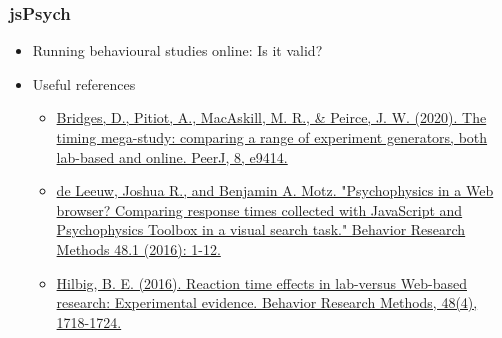 \documentclass[t]{beamer}
\begin{document}
\begin{frame}[fragile]
    \frametitle{jsPsych}
    \begin{itemize}
        \item Running behavioural studies online: Is it valid?
        \item Useful references
            \begin{itemize}\scriptsize
                \item \href{https://peerj.com/articles/9414/}{Bridges, D., Pitiot, A., MacAskill, M. R., \& Peirce, J. W. (2020). The timing mega-study: comparing a range of experiment generators, both lab-based and online. PeerJ, 8, e9414.}
                \item \href{https://link.springer.com/article/10.3758/s13428-015-0567-2}{de Leeuw, Joshua R., and Benjamin A. Motz. "Psychophysics in a Web browser? Comparing response times collected with JavaScript and Psychophysics Toolbox in a visual search task." Behavior Research Methods 48.1 (2016): 1-12.}
                \item \href{https://link.springer.com/article/10.3758/s13428-015-0678-9}{Hilbig, B. E. (2016). Reaction time effects in lab-versus Web-based research: Experimental evidence. Behavior Research Methods, 48(4), 1718-1724.}
            \end{itemize}
    \end{itemize}
\end{frame}
\end{document}
